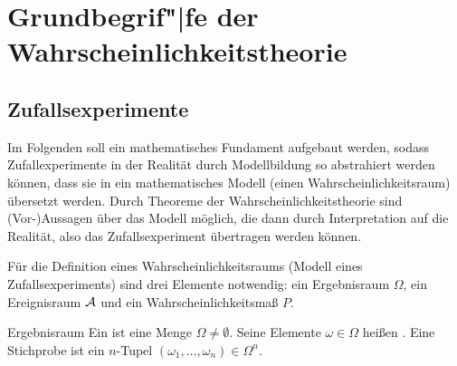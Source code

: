 \section{%
    Grundbegrif"|fe der Wahrscheinlichkeitstheorie%
}

\subsection{%
    Zufallsexperimente%
}

\begin{Bem}
    Im Folgenden soll ein mathematisches Fundament aufgebaut werden, sodass
    Zufallexperimente in der Realität durch Modellbildung so abstrahiert werden können,
    dass sie in ein mathematisches Modell (einen Wahrscheinlichkeitsraum) übersetzt werden.
    Durch Theoreme der Wahrscheinlichkeitstheorie sind (Vor-)Aussagen über das Modell möglich,
    die dann durch Interpretation auf die Realität, also das Zufallsexperiment übertragen werden
    können.
\end{Bem}

\linie

\begin{Bem}
    Für die Definition eines Wahrscheinlichkeitsraums (Modell eines Zufallsexperiments)
    sind drei Elemente notwendig:
    ein Ergebnisraum $\Omega$,
    ein Ereignisraum $\mathcal{A}$ und
    ein Wahrscheinlichkeitsmaß $P$.
\end{Bem}

\begin{Def}{Ergebnisraum}
    Ein  ist eine Menge $\Omega \not= \emptyset$.
    Seine Elemente $\omega \in \Omega$ heißen .
    Eine Stichprobe ist ein $n$-Tupel $(\omega_1, \dotsc, \omega_n) \in \Omega^n$.
\end{Def}

